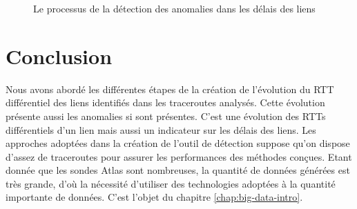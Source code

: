 \begin{figure}[h]
	\centering
	\resizebox{\textwidth}{\textheight}{
		
	}
	\caption{Le processus de la détection des anomalies dans les délais des liens}
	\label{fig:process-rttanalysis_tex}
\end{figure}




\section{Conclusion}

Nous avons abordé les différentes étapes de la création de l'évolution du RTT différentiel des liens identifiés dans les traceroutes analysés.  Cette évolution présente aussi les anomalies si sont présentes. C'est une évolution des RTTs différentiels d'un lien mais aussi un indicateur sur les délais des liens. Les approches adoptées dans la création de l'outil de détection suppose qu'on dispose d'assez de traceroutes pour assurer les performances des méthodes conçues. Etant donnée que les sondes Atlas sont nombreuses,  la quantité de données générées est très grande, d'où la nécessité d'utiliser des technologies adoptées à la quantité importante de données. C'est l'objet du chapitre \ref{chap:big-data-intro}.

